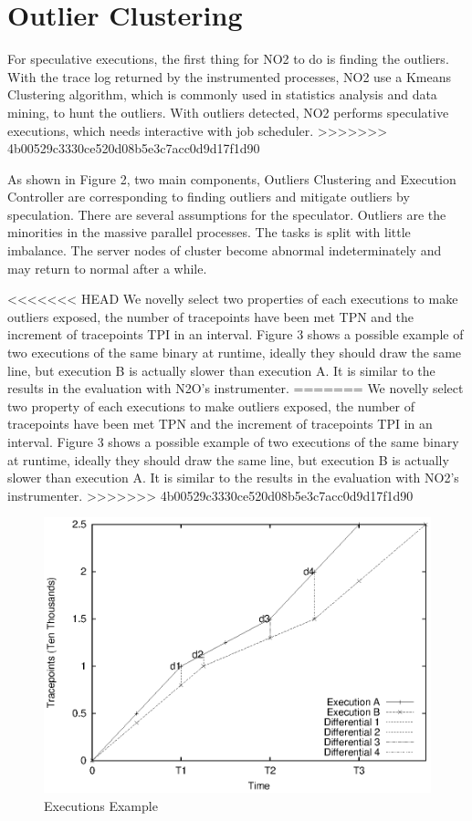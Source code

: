\section{Outlier Clustering}
For speculative executions, the first thing for NO2 to do is finding the outliers. With the trace log returned by the instrumented processes, NO2 use a Kmeans Clustering algorithm, which is commonly used in statistics analysis and data mining, to hunt the outliers. With outliers detected, NO2 performs speculative executions, which needs interactive with job scheduler. 
>>>>>>> 4b00529c3330ce520d08b5e3c7acc0d9d17f1d90

As shown in Figure 2, two main components, Outliers Clustering and Execution Controller are corresponding to finding outliers and mitigate outliers by speculation. There are several assumptions for the speculator. Outliers are the minorities in the massive parallel processes. The tasks is split with little imbalance. The server nodes of cluster become abnormal indeterminately and may return to normal after a while.

<<<<<<< HEAD
We novelly select two properties of each executions to make outliers exposed, the number of tracepoints have been met TPN and the increment of tracepoints TPI in an interval. Figure 3 shows a possible example of two executions of the same binary at runtime, ideally they should draw the same line, but execution B is actually slower than execution A. It is similar to the results in the evaluation with N2O’s instrumenter.
=======
We novelly select two property of each executions to make outliers exposed, the number of tracepoints have been met TPN and the increment of tracepoints TPI in an interval. Figure 3 shows a possible example of two executions of the same binary at runtime, ideally they should draw the same line, but execution B is actually slower than execution A. It is similar to the results in the evaluation with NO2’s instrumenter. 
>>>>>>> 4b00529c3330ce520d08b5e3c7acc0d9d17f1d90

\begin{figure}
\centering
\includegraphics[width=0.9\columnwidth, angle=-90]{figures/executions_example.eps}
\caption{Executions Example}
\label{figure:executionsexample}
\end{figure}

